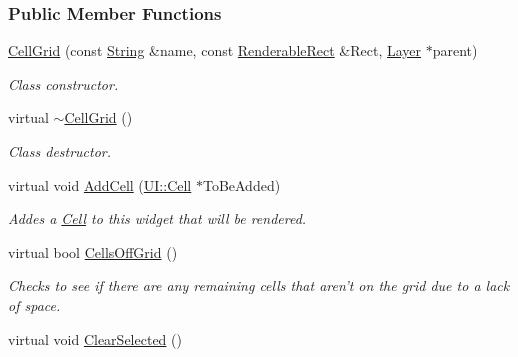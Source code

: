 \subsubsection*{Public Member Functions}
\begin{DoxyCompactItemize}
\item 
\hyperlink{classMezzanine_1_1UI_1_1CellGrid_a198dfab3b71fbd9f89b7aa76c43881bb}{CellGrid} (const \hyperlink{namespaceMezzanine_acf9fcc130e6ebf08e3d8491aebcf1c86}{String} \&name, const \hyperlink{structMezzanine_1_1UI_1_1RenderableRect}{RenderableRect} \&Rect, \hyperlink{classMezzanine_1_1UI_1_1Layer}{Layer} $\ast$parent)
\begin{DoxyCompactList}\small\item\em Class constructor. \item\end{DoxyCompactList}\item 
\hypertarget{classMezzanine_1_1UI_1_1CellGrid_a4ffeba2ec2e555c80f7224efcf886e42}{
virtual \hyperlink{classMezzanine_1_1UI_1_1CellGrid_a4ffeba2ec2e555c80f7224efcf886e42}{$\sim$CellGrid} ()}
\label{classMezzanine_1_1UI_1_1CellGrid_a4ffeba2ec2e555c80f7224efcf886e42}

\begin{DoxyCompactList}\small\item\em Class destructor. \item\end{DoxyCompactList}\item 
virtual void \hyperlink{classMezzanine_1_1UI_1_1CellGrid_ab162c701a9c24dde35709d71edf53972}{AddCell} (\hyperlink{classMezzanine_1_1UI_1_1Cell}{UI::Cell} $\ast$ToBeAdded)
\begin{DoxyCompactList}\small\item\em Addes a \hyperlink{classMezzanine_1_1UI_1_1Cell}{Cell} to this widget that will be rendered. \item\end{DoxyCompactList}\item 
virtual bool \hyperlink{classMezzanine_1_1UI_1_1CellGrid_a98a6713c4723fd6021a167380c92d716}{CellsOffGrid} ()
\begin{DoxyCompactList}\small\item\em Checks to see if there are any remaining cells that aren't on the grid due to a lack of space. \item\end{DoxyCompactList}\item 
\hypertarget{classMezzanine_1_1UI_1_1CellGrid_a11e4c5d524ed68823a61011e75bbaddb}{
virtual void \hyperlink{classMezzanine_1_1UI_1_1CellGrid_a11e4c5d524ed68823a61011e75bbaddb}{ClearSelected} ()}
\label{classMezzanine_1_1UI_1_1CellGrid_a11e4c5d524ed68823a61011e75bbaddb}


\end{DoxyCompactItemize}
